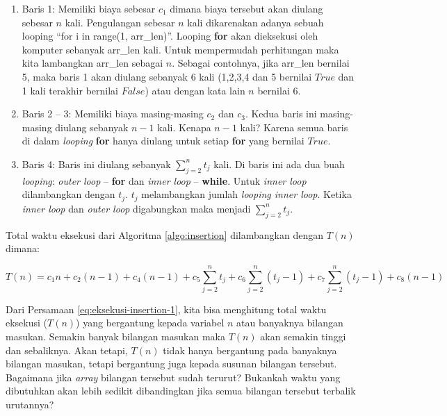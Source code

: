 \begin{enumerate}
	\item Baris 1: Memiliki biaya sebesar $c_1$ dimana biaya tersebut akan diulang sebesar $n$ kali. Pengulangan sebesar $n$ kali dikarenakan adanya sebuah looping ``for i in range(1, arr\_len)''. Looping \textbf{for} akan dieksekusi oleh komputer sebanyak arr\_len kali. Untuk mempermudah perhitungan maka kita lambangkan arr\_len sebagai $n$. Sebagai contohnya, jika arr\_len bernilai 5, maka baris 1 akan diulang sebanyak 6 kali (1,2,3,4 dan 5 bernilai $True$ dan 1 kali terakhir bernilai $False$) atau dengan kata lain $n$ bernilai 6.
	\item Baris 2 -- 3: Memiliki biaya masing-masing $c_{2}$ dan $c_{3}$. Kedua baris ini masing-masing diulang sebanyak $n-1$ kali. Kenapa $n-1$ kali? Karena semua baris di dalam \textit{looping} \textbf{for} hanya diulang untuk setiap \textbf{for} yang bernilai $True$.
	\item Baris 4: Baris ini diulang sebanyak $\sum\limits_{j=2}^n t_{j}$ kali. Di baris ini ada dua buah \textit{looping}: \textit{outer loop} -- \textbf{for} dan \textit{inner loop} -- \textbf{while}. Untuk \textit{inner loop} dilambangkan dengan $t_{j}$. $t_{j}$ melambangkan jumlah \textit{looping inner loop}. Ketika \textit{inner loop} dan \textit{outer loop} digabungkan maka menjadi $\sum\limits_{j=2}^n t_{j}$.  
\end{enumerate}                                       
                                     
Total waktu eksekusi dari Algoritma \ref{algo:insertion} dilambangkan dengan $T(n)$ dimana:

\begin{equation}\label{eq:eksekusi-insertion-1}
    T(n) = c_{1}n + c_{2}(n-1) + c_{4}(n-1) + c_{5}\sum\limits_{j=2}^n t_{j} + c_{6}\sum\limits_{j=2}^n (t_{j}-1) + c_{7}\sum\limits_{j=2}^n (t_{j}-1) + c_{8}(n-1) 
\end{equation} 

Dari Persamaan \ref{eq:eksekusi-insertion-1}, kita bisa menghitung total waktu eksekusi ($T(n)$) yang bergantung kepada variabel $n$ atau banyaknya bilangan masukan. Semakin banyak bilangan masukan maka $T(n)$ akan semakin tinggi dan sebaliknya. Akan tetapi, $T(n)$ tidak hanya bergantung pada banyaknya bilangan masukan, tetapi bergantung juga kepada susunan bilangan tersebut. Bagaimana jika \textit{array} bilangan tersebut sudah terurut? Bukankah waktu yang dibutuhkan akan lebih sedikit dibandingkan jika semua bilangan tersebut terbalik urutannya?

